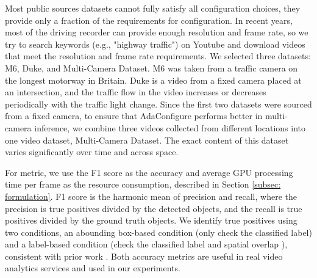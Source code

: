 Most public sources datasets cannot fully satisfy all configuration choices, they provide only a fraction of the requirements for configuration. %
In recent years, most of the driving recorder can provide enough resolution and frame rate, so we try to search keywords (e.g., "highway traffic") on Youtube and download videos that meet the resolution and frame rate requirements. We selected three datasets: M6, Duke, and Multi-Camera Dataset. M6 was taken from a traffic camera on the longest motorway in Britain. Duke is a video from a fixed camera placed at an intersection, and the traffic flow in the video increases or decreases periodically with the traffic light change. Since the first two datasets were sourced from a fixed camera, to ensure that AdaConfigure performs better in multi-camera inference, we combine three videos collected from different locations into one video dataset, Multi-Camera Dataset. The exact content of this dataset varies significantly over time and across space.

For metric, we use the F1 score as the accuracy and average GPU processing time per frame as the resource consumption, described in Section \ref{subsec: formulation}. F1 score
is the harmonic mean of precision and recall, where the precision is true positives divided by the detected objects, and the recall is true positives divided by the ground truth objects. We identify true positives using two conditions, an abounding box-based condition (only check the classified label) and a label-based condition (check the classified label and spatial overlap \cite{overlap}), consistent with prior work \cite{jiang2018chameleon,noscope}. Both accuracy metrics are useful in real video analytics services and used in our experiments.

